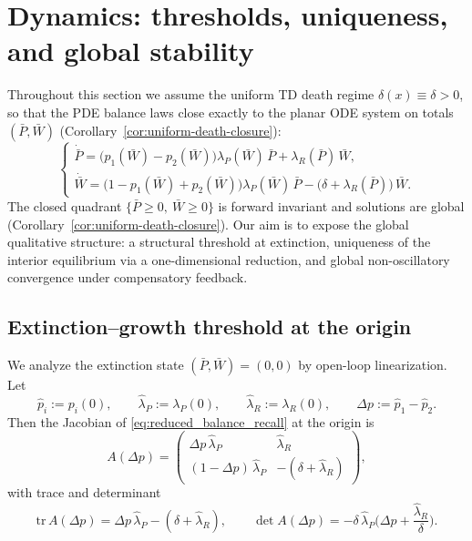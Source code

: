 \documentclass[pdflatex,sn-mathphys-ay]{sn-jnl}
\theoremstyle{thmstyleone}
\theoremstyle{definition}
\theoremstyle{remark}
\begin{document}
\section{Dynamics: thresholds, uniqueness, and global stability}
\label{sec:dynamics}
Throughout this section we assume the uniform TD death regime $\delta(x)\equiv\delta>0$,
so that the PDE balance laws close exactly to the planar ODE system on totals
$(\bar P,\bar W)$ (Corollary~\ref{cor:uniform-death-closure}):
\begin{equation}\label{eq:reduced_balance_recall}
\begin{cases}
\dot{\bar P}
=\Big(p_1(\bar W)-p_2(\bar W)\Big)\lambda_P(\bar W)\,\bar P
+\lambda_R(\bar P)\,\bar W,\\[6pt]
\dot{\bar W}
=\Big(1-p_1(\bar W)+p_2(\bar W)\Big)\lambda_P(\bar W)\,\bar P
-\big(\delta+\lambda_R(\bar P)\big)\,\bar W.
\end{cases}
\end{equation}
The closed quadrant $\{\bar P\ge0,\ \bar W\ge0\}$ is forward invariant and solutions are global
(Corollary~\ref{cor:uniform-death-closure}). Our aim is to expose the global qualitative structure:
a structural threshold at extinction, uniqueness of the interior equilibrium via a one-dimensional
reduction, and global non-oscillatory convergence under compensatory feedback.

\subsection{Extinction--growth threshold at the origin}
\label{subsec:threshold_origin}
We analyze the extinction state $(\bar P,\bar W)=(0,0)$ by open-loop linearization.
Let
\[
\hat p_i:=p_i(0),\qquad
\hat\lambda_P:=\lambda_P(0),\qquad
\hat\lambda_R:=\lambda_R(0),\qquad
\Delta p:=\hat p_1-\hat p_2 .
\]
Then the Jacobian of \eqref{eq:reduced_balance_recall} at the origin is
\begin{equation}\label{eq:Jac_origin}
A(\Delta p)=
\begin{pmatrix}
\Delta p\,\hat\lambda_P & \hat\lambda_R\\
(1-\Delta p)\,\hat\lambda_P & -(\delta+\hat\lambda_R)
\end{pmatrix},
\end{equation}
with trace and determinant
\begin{equation}\label{eq:tr_det_origin}
\mathrm{tr}\,A(\Delta p)=\Delta p\,\hat\lambda_P-(\delta+\hat\lambda_R),\qquad
\det A(\Delta p)=-\delta\,\hat\lambda_P\Big(\Delta p+\frac{\hat\lambda_R}{\delta}\Big).
\end{equation}
\end{document}
